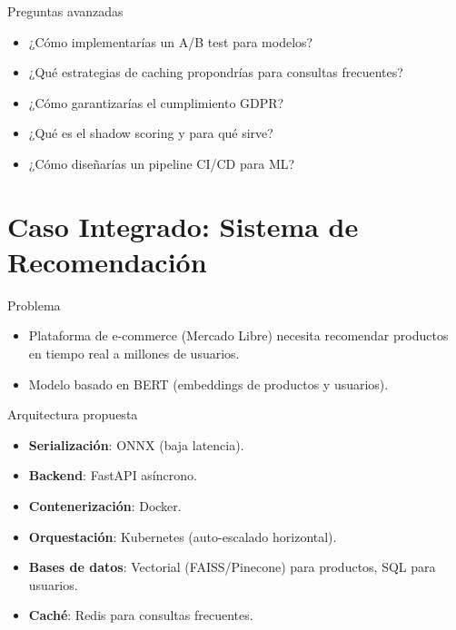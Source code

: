 \documentclass[aspectratio=169, 10pt, xcolor=table]{beamer}
\begin{document}
\begin{frame}{Preguntas avanzadas}
    \begin{itemize}
        \item ¿Cómo implementarías un A/B test para modelos?
        \item ¿Qué estrategias de caching propondrías para consultas frecuentes?
        \item ¿Cómo garantizarías el cumplimiento GDPR?
        \item ¿Qué es el shadow scoring y para qué sirve?
        \item ¿Cómo diseñarías un pipeline CI/CD para ML?
    \end{itemize}
\end{frame}

\section{Caso Integrado: Sistema de Recomendación}

\begin{frame}{Problema}
    \begin{itemize}
        \item Plataforma de e-commerce (Mercado Libre) necesita recomendar productos en tiempo real a millones de usuarios.
        \item Modelo basado en BERT (embeddings de productos y usuarios).
    \end{itemize}
\end{frame}

\begin{frame}{Arquitectura propuesta}
    \begin{itemize}
        \item \textbf{Serialización}: ONNX (baja latencia).
        \item \textbf{Backend}: FastAPI asíncrono.
        \item \textbf{Contenerización}: Docker.
        \item \textbf{Orquestación}: Kubernetes (auto-escalado horizontal).
        \item \textbf{Bases de datos}: Vectorial (FAISS/Pinecone) para productos, SQL para usuarios.
        \item \textbf{Caché}: Redis para consultas frecuentes.
    \end{itemize}
\end{frame}
\end{document}
